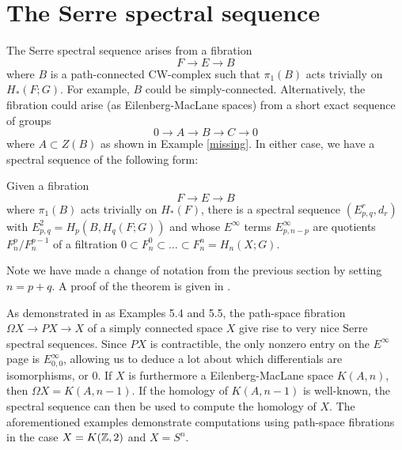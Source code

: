 \section{The Serre spectral sequence}
The Serre spectral sequence arises from a fibration
$$F\rightarrow E \rightarrow B$$
where $B$ is a path-connected CW-complex such that $\pi_1(B)$ acts trivially on $H_*(F;G)$.
For example, $B$ could be simply-connected. Alternatively, the fibration could arise (as Eilenberg-MacLane spaces) from a short exact sequence of groups $$0\rightarrow A\rightarrow B\rightarrow C\rightarrow 0$$ where $A\subset Z(B)$ as shown in Example \ref{missing}. In either case, we have a spectral sequence of the following form:
\begin{theorem}
Given a fibration $$F\rightarrow E \rightarrow B$$ where $\pi_1(B)$ acts trivially on $H_*(F)$, there is a spectral sequence $(E_{p,q}^r,d_r)$ with $E_{p,q}^2=H_p(B,H_q(F;G))$ and whose $E^{\infty}$ terms $E^\infty_{p,n-p}$ are quotients $F_n^p/F_n^{p-1}$ of a filtration $0\subset F_n^0\subset\dots\subset F_n^n=H_n(X;G)$.
\end{theorem}
Note we have made a change of notation from the previous section by setting $n=p+q$. A proof of the theorem is given in \cite{Hatcher-spec}.

As demonstrated in \cite{Hatcher-spec} as Examples 5.4 and 5.5, the path-space fibration $\Omega X\rightarrow PX\rightarrow X$ of a simply connected space $X$ give rise to very nice Serre spectral sequences. Since $PX$ is contractible, the only nonzero entry on the $E^\infty$ page is $E^{\infty}_{0,0}$, allowing us to deduce a lot about which differentials are isomorphisms, or $0$. If $X$ is furthermore a Eilenberg-MacLane space $K(A,n)$, then $\Omega X=K(A,n-1)$. If the homology of $K(A,n-1)$ is well-known, the spectral sequence can then be used to compute the homology of $X$. The aforementioned examples demonstrate computations using path-space fibrations in the case $X=K(\mathbb{Z},2)$ and $X=S^n$.

